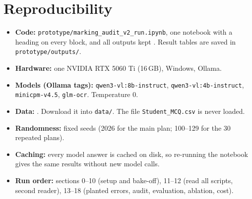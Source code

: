 \chapter{Reproducibility}
\label{app:repro}
\begin{itemize}
  \item \textbf{Code:} \texttt{prototype/marking\_audit\_v2\_run.ipynb}, one notebook with a heading on every block, and all
        outputs kept \citep{notebook}. Result tables are saved in \texttt{prototype/outputs/}.
  \item \textbf{Hardware:} one NVIDIA RTX 5060 Ti (16\,GB), Windows, Ollama.
  \item \textbf{Models (Ollama tags):} \texttt{qwen3-vl:8b-instruct}, \texttt{qwen3-vl:4b-instruct}, \texttt{minicpm-v4.5},
        \texttt{glm-ocr}. Temperature 0.
  \item \textbf{Data:} \citep{dataset2026}. Download it into \texttt{data/}. The file \texttt{Student\_MCQ.csv} is never loaded.
  \item \textbf{Randomness:} fixed seeds (2026 for the main plan; 100--129 for the 30 repeated plans).
  \item \textbf{Caching:} every model answer is cached on disk, so re-running the notebook gives the same results without new
        model calls.
  \item \textbf{Run order:} sections 0--10 (setup and bake-off), 11--12 (read all scripts, second reader), 13--18 (planted
        errors, audit, evaluation, ablation, cost).
\end{itemize}
